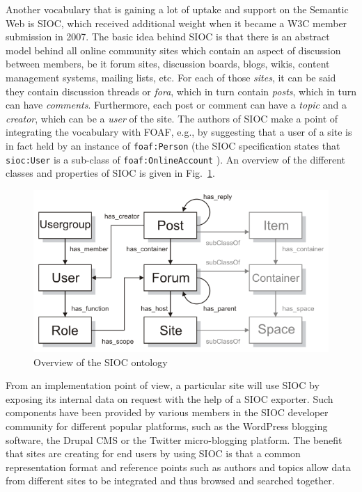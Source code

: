 \documentclass[twoside]{fast_latex}
\begin{document}
Another vocabulary that is gaining a lot of uptake and support on the Semantic Web is SIOC, which received additional weight when it became a W3C member submission in 2007. The basic idea behind SIOC is that there is an abstract model behind all online community sites which contain an aspect of discussion between members, be it forum sites, discussion boards, blogs, wikis, content management systems, mailing lists, etc. For each of those \emph{sites}, it can be said they contain discussion threads or \emph{fora}, which in turn contain \emph{posts}, which in turn can have \emph{comments}. Furthermore, each post or comment can have a \emph{topic} and a \emph{creator}, which can be a \emph{user} of the site. The authors of SIOC make a point of integrating the vocabulary with FOAF, e.g., by suggesting that a user of a site is in fact held by an instance of \texttt{foaf:Person} (the SIOC specification states that \texttt{sioc:User} is a sub-class of \texttt{foaf:OnlineAccount} \cite{sioc_spec2009}). An overview of the different classes and properties of SIOC is given in Fig.~\ref{fig:sioc_overview}.

\begin{figure}
  \begin{center}
    \includegraphics[width=0.8\linewidth]{images/sioc_overview}
    \caption{Overview of the SIOC ontology}
    \label{fig:sioc_overview}
  \end{center}
\end{figure}

From an implementation point of view, a particular site will use SIOC by exposing its internal data on request with the help of a SIOC exporter. Such components have been provided by various members in the SIOC developer community for different popular platforms, such as the WordPress blogging software, the Drupal CMS or the Twitter micro-blogging platform. The benefit that sites are creating for end users by using SIOC is that a common representation format and reference points such as authors and topics allow data from different sites to be integrated and thus browsed and searched together.
\end{document}
